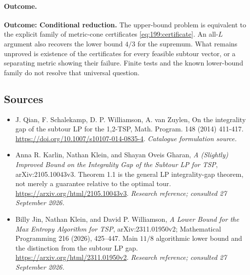 \documentclass[11pt,a4paper]{article}
\numberwithin{equation}{section}
\begin{document}
\paragraph{Outcome.}
\textbf{Outcome: Conditional reduction.}
The upper-bound problem is equivalent to the explicit family of
metric-cone certificates \eqref{eq:199:certificate}. An all-$L$ argument
also recovers the lower bound $4/3$ for the supremum. What remains
unproved is existence of the certificates for every feasible subtour
vector, or a separating metric showing their failure. Finite tests and
the known lower-bound family do not resolve that universal question.

\subsection{Sources}
\begin{itemize}\raggedright
\item[\textnormal{[S1]}]\hypertarget{source:199:1}{} J. Qian, F. Schalekamp, D. P. Williamson, A. van Zuylen, On the integrality gap of the subtour LP for the 1,2-TSP, Math. Program. 148 (2014) 411-417.
\url{https://doi.org/10.1007/s10107-014-0835-4}.
{\small\textit{Catalogue formulation source.}}
\item[\textnormal{[E1]}]\hypertarget{extra:199:1}{} Anna R. Karlin, Nathan Klein, and Shayan Oveis Gharan, \emph{A (Slightly) Improved Bound on the Integrality Gap of the Subtour LP for TSP}, arXiv:2105.10043v3. Theorem 1.1 is the general LP integrality-gap theorem, not merely a guarantee relative to the optimal tour.
\url{https://arxiv.org/html/2105.10043v3}.
{\small\textit{Research reference; consulted 27 September 2026.}}
\item[\textnormal{[E2]}]\hypertarget{extra:199:2}{} Billy Jin, Nathan Klein, and David P. Williamson, \emph{A Lower Bound for the Max Entropy Algorithm for TSP}, arXiv:2311.01950v2; Mathematical Programming 216 (2026), 425--447. Main $11/8$ algorithmic lower bound and the distinction from the subtour LP gap.
\url{https://arxiv.org/html/2311.01950v2}.
{\small\textit{Research reference; consulted 27 September 2026.}}
\end{itemize}
\end{document}
